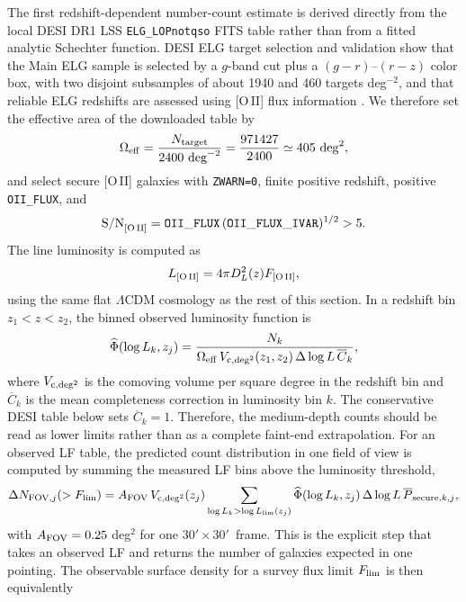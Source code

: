 \documentclass[10pt,onecolumn]{article}
\newcommand{\fovlarge}{$30'\!\times30'$}
\begin{document}
The first redshift-dependent number-count estimate is derived directly from the local DESI DR1 LSS \texttt{ELG\_\allowbreak LOPnotqso} FITS table rather than from a fitted analytic Schechter function. DESI ELG target selection and validation show that the Main ELG sample is selected by a $g$-band cut plus a $(g-r)$--$(r-z)$ color box, with two disjoint subsamples of about 1940 and 460 targets deg$^{-2}$, and that reliable ELG redshifts are assessed using [O\,II] flux information \cite{raichoor2022}. We therefore set the effective area of the downloaded table by
\begin{equation}
  \Omega_{\rm eff}=
  \frac{N_{\rm target}}{2400\ {\rm deg}^{-2}}
  =
  \frac{971427}{2400}
  \simeq405\ {\rm deg}^{2},
\end{equation}
and select secure [O\,II] galaxies with \texttt{ZWARN=0}, finite positive redshift, positive \texttt{OII\_FLUX}, and
\begin{equation}
  {\rm S/N}_{\rm [O\,II]}=
  {\tt OII\_FLUX}\,({\tt OII\_FLUX\_IVAR})^{1/2}>5 .
\end{equation}
The line luminosity is computed as
\begin{equation}
  L_{\rm [O\,II]}=4\pi D_L^2(z)F_{\rm [O\,II]},
\end{equation}
using the same flat $\Lambda$CDM cosmology as the rest of this section. In a redshift bin $z_1<z<z_2$, the binned observed luminosity function is
\begin{equation}
  \widehat{\Phi}(\log L_k,z_j)=
  \frac{N_k}
  {\Omega_{\rm eff}\,V_{\rm c,deg^2}(z_1,z_2)\,\Delta\log L\,\overline{C}_k},
\end{equation}
where $V_{\rm c,deg^2}$ is the comoving volume per square degree in the redshift bin and $\overline{C}_k$ is the mean completeness correction in luminosity bin $k$. The conservative DESI table below sets $\overline{C}_k=1$. Therefore, the medium-depth counts should be read as lower limits rather than as a complete faint-end extrapolation. For an observed LF table, the predicted count distribution in one field of view is computed by summing the measured LF bins above the luminosity threshold,
\begin{equation}
  \Delta N_{{\rm FOV},j}(>F_{\rm lim}) =
  A_{\rm FOV}\,
  V_{\rm c,deg^2}(z_j)
  \sum_{\log L_k>\log L_{\rm lim}(z_j)}
  \widehat{\Phi}(\log L_k,z_j)\,
  \Delta\log L\,
  \overline{P}_{{\rm secure},k,j},
\end{equation}
with $A_{\rm FOV}=0.25$ deg$^2$ for one \fovlarge\ frame. This is the explicit step that takes an observed LF and returns the number of galaxies expected in one pointing. The observable surface density for a survey flux limit $F_{\rm lim}$ is then equivalently
\end{document}
